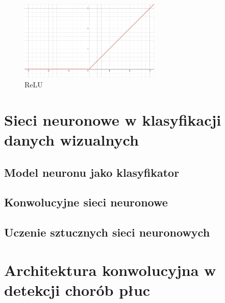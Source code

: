 \documentclass{article}
\begin{document}
\begin{figure}[H]
	\centering
	\includegraphics[width=0.6\textwidth,keepaspectratio=true]{ReLu}
	\caption{
		ReLU
	}
\end{figure}

\section{Sieci neuronowe w klasyfikacji danych wizualnych}

\subsection{Model neuronu jako klasyfikator}

\subsection{Konwolucyjne sieci neuronowe}

\subsection{Uczenie sztucznych sieci neuronowych}



\section{Architektura konwolucyjna w detekcji chorób płuc}





	
\end{document}
